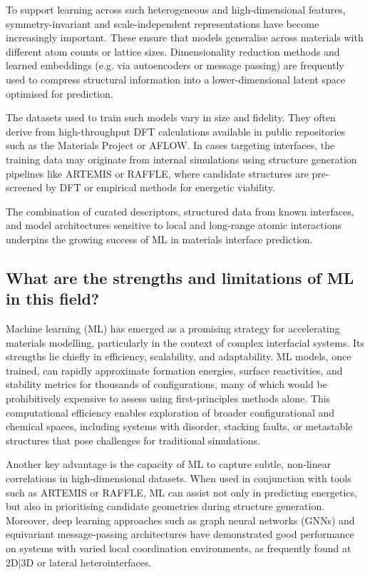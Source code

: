 To support learning across such heterogeneous and high-dimensional features, symmetry-invariant and scale-independent representations have become increasingly important. These ensure that models generalise across materials with different atom counts or lattice sizes. Dimensionality reduction methods and learned embeddings (e.g. via autoencoders or message passing) are frequently used to compress structural information into a lower-dimensional latent space optimised for prediction. 
 
The datasets used to train such models vary in size and fidelity. They often derive from high-throughput DFT calculations available in public repositories such as the Materials Project or AFLOW. In cases targeting interfaces, the training data may originate from internal simulations using structure generation pipelines like ARTEMIS or RAFFLE, where candidate structures are pre-screened by DFT or empirical methods for energetic viability. 
 
The combination of curated descriptors, structured data from known interfaces, and model architectures sensitive to local and long-range atomic interactions underpins the growing success of ML in materials interface prediction. 
 
\subsection{What are the strengths and limitations of ML in this field?} 
 
Machine learning (ML) has emerged as a promising strategy for accelerating materials modelling, particularly in the context of complex interfacial systems. Its strengths lie chiefly in efficiency, scalability, and adaptability. ML models, once trained, can rapidly approximate formation energies, surface reactivities, and stability metrics for thousands of configurations, many of which would be prohibitively expensive to assess using first-principles methods alone. This computational efficiency enables exploration of broader configurational and chemical spaces, including systems with disorder, stacking faults, or metastable structures that pose challenges for traditional simulations. 
 
Another key advantage is the capacity of ML to capture subtle, non-linear correlations in high-dimensional datasets. When used in conjunction with tools such as ARTEMIS or RAFFLE, ML can assist not only in predicting energetics, but also in prioritising candidate geometries during structure generation. Moreover, deep learning approaches such as graph neural networks (GNNs) and equivariant message-passing architectures have demonstrated good performance on systems with varied local coordination environments, as frequently found at 2D|3D or lateral heterointerfaces. 
 
